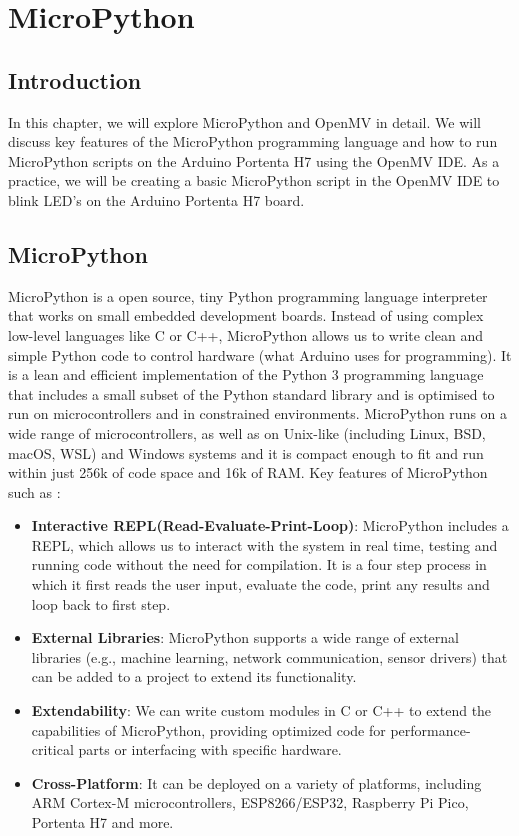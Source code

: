 %
%



\chapter{MicroPython}

\section{Introduction}
In this chapter, we will explore MicroPython and OpenMV in detail. We will discuss key features of the MicroPython programming language and how to run MicroPython scripts on the Arduino Portenta H7 using the OpenMV IDE. As a practice, we will be creating a basic MicroPython script in the OpenMV IDE to blink LED’s on the Arduino Portenta H7 board.

\section{MicroPython}
MicroPython is a open source, tiny Python programming language interpreter that works on small embedded development boards. Instead of using complex low-level languages like C or C++, MicroPython allows us to write clean and simple Python code to control hardware (what Arduino uses for programming). It is a lean and efficient implementation of the Python 3 programming language that includes a small subset of the Python standard library and is optimised to run on microcontrollers and in constrained environments.
MicroPython runs on a wide range of microcontrollers, as well as on Unix-like (including Linux, BSD, macOS, WSL) and Windows systems and it is compact enough to fit and run within just 256k of code space and 16k of RAM. \cite{MicroPythonGitHub:2025,MicroPython:2025}
Key features of MicroPython such as :
\begin{itemize}
	\item \textbf{Interactive REPL(Read-Evaluate-Print-Loop)}: MicroPython includes a REPL, which allows us to interact with the system in real time, testing and running code without the need for compilation. It is a four step process in which it first reads the user input, evaluate the code, print any results and loop back to first step.
	\item \textbf{External Libraries}: MicroPython supports a wide range of external libraries (e.g., machine learning, network communication, sensor drivers) that can be added to a project to extend its functionality.
	\item \textbf{Extendability}: We can write custom modules in C or C++ to extend the capabilities of MicroPython, providing optimized code for performance-critical parts or interfacing with specific hardware.
	\item \textbf{Cross-Platform}: It can be deployed on a variety of platforms, including ARM Cortex-M microcontrollers, ESP8266/ESP32, Raspberry Pi Pico, Portenta H7 and more.
\end{itemize}

